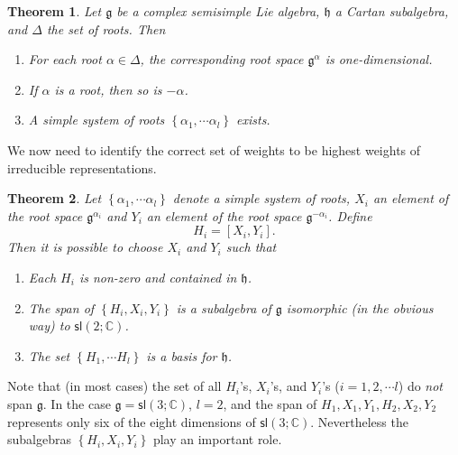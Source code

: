 \documentclass[12pt]{amsbook}
\let \frak = \mathfrak
\theoremstyle{plain}
\newtheorem{theorem}{Theorem}
\numberwithin{equation}{chapter}
\numberwithin{theorem}{chapter}
\begin{document}
\begin{theorem}
\label{roots.exist}Let $\frak{g}$ be a complex semisimple Lie algebra,
$\frak{h}$ a Cartan subalgebra, and $\Delta$ the set of roots. Then

\begin{enumerate}
\item  For each root $\alpha\in\Delta$, the corresponding root space
$\frak{g}^{\alpha}$ is one-dimensional.

\item  If $\alpha$ is a root, then so is $-\alpha$.

\item  A simple system of roots $\left\{  \alpha_{1},\cdots\alpha_{l}\right\}
$ exists.
\end{enumerate}
\end{theorem}

We now need to identify the correct set of weights to be highest weights of
irreducible representations.

\begin{theorem}
\label{sl2s}Let $\left\{  \alpha_{1},\cdots\alpha_{l}\right\}  $ denote a
simple system of roots, $X_{i}$ an element of the root space $\frak{g}%
^{\alpha_{i}}$ and $Y_{i}$ an element of the root space $\frak{g}^{-\alpha
_{i}}$. Define
\[
H_{i}=\left[  X_{i},Y_{i}\right]  \text{.}%
\]
Then it is possible to choose $X_{i}$ and $Y_{i}$ such that

\begin{enumerate}
\item  Each $H_{i}$ is non-zero and contained in $\frak{h}$.

\item  The span of $\left\{  H_{i},X_{i},Y_{i}\right\}  $ is a subalgebra of
$\frak{g}$ isomorphic (in the obvious way) to $\mathsf{sl}(2;\mathbb{C})$.

\item  The set $\left\{  H_{1},\cdots H_{l}\right\}  $ is a basis for
$\frak{h}$.
\end{enumerate}
\end{theorem}

Note that (in most cases) the set of all $H_{i}$'s, $X_{i}$'s, and $Y_{i}$'s
($i=1,2,\cdots l$) do \textit{not} span $\frak{g}$. In the case $\frak{g}%
=\mathsf{sl}\left(  3;\mathbb{C}\right)  $, $l=2$, and the span of
$H_{1},X_{1},Y_{1},H_{2},X_{2},Y_{2}$ represents only six of the eight
dimensions of $\mathsf{sl}\left(  3;\mathbb{C}\right)  $. Nevertheless the
subalgebras $\left\{  H_{i},X_{i},Y_{i}\right\}  $ play an important role.
\end{document}

